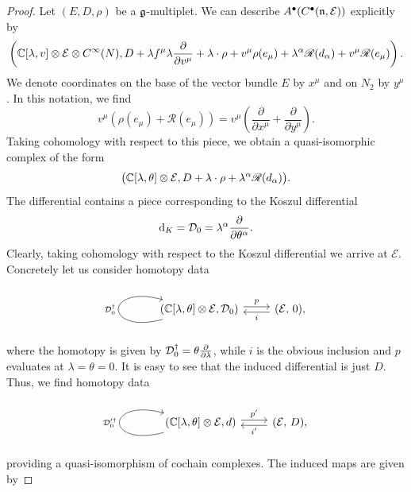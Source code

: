 \documentclass[pdftex]{sigma}
\numberwithin{equation}{section}
\def\cE{\mathcal E}\def\cF{\mathcal F}\def\cG{\mathcal G}\def\cH{\mathcal H}
\def\bu{\bullet}
\def\d{{\rm d}}
\def\sR{\mathscr R}
\begin{document}
\begin{proof}
	Let $(E,D,\rho)$ be a $\mathfrak g$-multiplet. We can describe $A^\bullet(C^\bu(\fn , \cE))$ explicitly by
	\begin{equation*}
	\left( \CC[\lambda, v] \otimes \cE \otimes C^\infty(N) , D + \lambda f^\mu \lambda \frac{\partial}{\partial v^\mu} + \lambda \cdot \rho + v^\mu \rho(e_\mu) + \lambda^\alpha \sR(d_\alpha) + v^\mu \sR(e_\mu) \right) .
	\end{equation*}
	We denote coordinates on the base of the vector bundle $E$ by $x^\mu$ and on $N_2$ by $y^\mu$. In this notation, we find
	\begin{equation*}
	v^\mu\left( \rho(e_\mu) + \sR(e_\mu) \right) = v^\mu \left( \frac{\partial}{\partial x^\mu} + \frac{\partial}{\partial y^\mu} \right) .
	\end{equation*}
	Taking cohomology with respect to this piece, we obtain a quasi-isomorphic complex of the form
	\begin{equation*}
	\big( \CC[\lambda, \theta] \otimes \cE , D + \lambda \cdot \rho + \lambda^\alpha \sR(d_\alpha) \big) .
	\end{equation*}
	The differential contains a piece corresponding to the Koszul differential
	\begin{equation*}
	\d_K = \cD_0 = \lambda^\alpha \frac{\partial}{\partial \theta^\alpha} .
	\end{equation*}
	Clearly, taking cohomology with respect to the Koszul differential we arrive at $\cE$. Concretely let us consider homotopy data
	\begin{equation*}
	\begin{tikzcd}
	\arrow[loop left]{l}{\cD_0^\dagger}(\CC[\lambda,\theta] \otimes \cE , \cD_0 )\arrow[r, shift left, "p"] &( \cE , \, 0)\arrow[l, shift left, "i"] ,
	\end{tikzcd}
	\end{equation*}
	where the homotopy is given by $\mathcal D_0^\dagger = \theta \frac{\partial}{\partial \lambda}$, while $i$ is the obvious inclusion and $p$ evaluates at $\lambda = \theta = 0$. It is easy to see that the induced differential is just $D$. Thus, we find homotopy data
	\begin{equation} \label{eq: hdata}
	\begin{tikzcd}
	\arrow[loop left]{l}{\cD_0'^\dagger}(\CC[\lambda,\theta] \otimes \cE , d )\arrow[r, shift left, "p'"] &( \cE , \, D )\arrow[l, shift left, "i'"] ,
	\end{tikzcd}
	\end{equation}
	providing a quasi-isomorphism of cochain complexes. The induced maps are given by

\end{proof}
\end{document}
